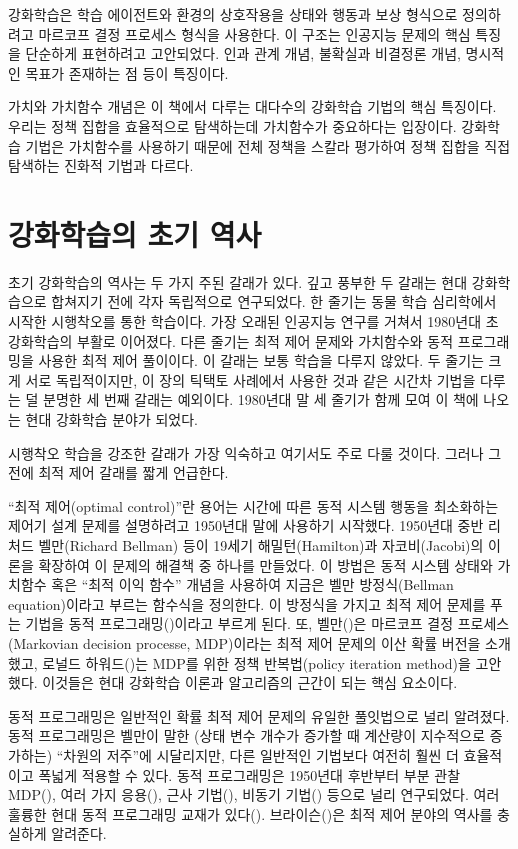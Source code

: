 
강화학습은 학습 에이전트와 환경의 상호작용을 상태와 행동과 보상 형식으로
정의하려고 마르코프 결정 프로세스 형식을 사용한다.
이 구조는 인공지능 문제의 핵심 특징을 단순하게 표현하려고
고안되었다. 인과 관계 개념, 불확실과 비결정론 개념, 명시적인 목표가 존재하는 점
등이 특징이다.

가치와 가치함수 개념은 이 책에서 다루는 대다수의 강화학습 기법의 핵심 특징이다.
우리는 정책 집합을 효율적으로 탐색하는데 가치함수가 중요하다는 입장이다.
강화학습 기법은 가치함수를 사용하기 때문에 전체 정책을 스칼라 평가하여 정책
집합을 직접 탐색하는 진화적 기법과 다르다.

\section{강화학습의 초기 역사}

초기 강화학습의 역사는 두 가지 주된 갈래가 있다. 깊고 풍부한 두 갈래는 현대
강화학습으로 합쳐지기 전에 각자 독립적으로 연구되었다. 한 줄기는 동물 학습
심리학에서 시작한 시행착오를 통한 학습이다. 가장 오래된 인공지능 연구를 거쳐서
1980년대 초 강화학습의 부활로 이어졌다. 다른 줄기는 최적 제어 문제와 가치함수와
동적 프로그래밍을 사용한 최적 제어 풀이이다. 이 갈래는 보통 학습을 다루지
않았다. 두 줄기는 크게 서로 독립적이지만, 이 장의 틱택토 사례에서 사용한 것과
같은 시간차 기법을 다루는 덜 분명한 세 번째 갈래는 예외이다. 1980년대 말 세
줄기가 함께 모여 이 책에 나오는 현대 강화학습 분야가 되었다.

시행착오 학습을 강조한 갈래가 가장 익숙하고 여기서도 주로 다룰 것이다. 그러나 그
전에 최적 제어 갈래를 짧게 언급한다.

``최적 제어(optimal control)''란 용어는 시간에 따른 동적 시스템 행동을
최소화하는 제어기 설계 문제를 설명하려고 1950년대 말에 사용하기 시작했다.
1950년대 중반 리처드 벨만(Richard Bellman) 등이 19세기 해밀턴(Hamilton)과
자코비(Jacobi)의 이론을 확장하여 이 문제의 해결책 중 하나를 만들었다. 이 방법은
동적 시스템 상태와 가치함수 혹은 ``최적 이익 함수'' 개념을 사용하여 지금은 벨만
방정식(Bellman equation)이라고 부르는 함수식을 정의한다. 이 방정식을 가지고 최적
제어 문제를 푸는 기법을 동적 프로그래밍(\cite{Bellman1957a})이라고 부르게 된다.
또, 벨만(\cite*{Bellman1957b})은 마르코프 결정 프로세스(Markovian decision
processe, MDP)이라는 최적 제어 문제의 이산 확률 버전을 소개했고, 로널드
하워드(\cite{Howard1960})는 MDP를 위한 정책 반복법(policy iteration method)을
고안했다. 이것들은 현대 강화학습 이론과 알고리즘의 근간이 되는 핵심 요소이다.

동적 프로그래밍은 일반적인 확률 최적 제어 문제의 유일한 풀잇법으로 널리
알려졌다. 동적 프로그래밍은 벨만이 말한 (상태 변수 개수가 증가할 때 계산량이
지수적으로 증가하는) ``차원의 저주''에 시달리지만, 다른 일반적인 기법보다 여전히
훨씬 더 효율적이고 폭넓게 적용할 수 있다. 동적 프로그래밍은 1950년대 후반부터
부분 관찰 MDP(\cite{Lovejoy1991}), 여러 가지 응용(\cite{White1985, White1988,
White1993}), 근사 기법(\cite{Rust1996}), 비동기 기법(\cite{Bertsekas1982,
Bertsekas1983}) 등으로 널리 연구되었다. 여러 훌륭한 현대 동적 프로그래밍 교재가
있다(\cite[예,][]{Bertsekas2005, Bertsekas2012, Puterman1994, Ross1983,
Whittle1982, Whittle1983}). 브라이슨(\cite{Bryson1996})은 최적 제어 분야의
역사를 충실하게 알려준다.


